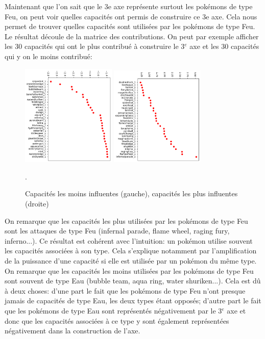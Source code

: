 \documentclass[a4paper,12pt]{article}
\begin{document}
Maintenant que l'on sait que le 3e axe représente surtout les pokémons de type Feu, on peut voir quelles capacités ont permis de construire ce 3e axe. Cela nous permet de trouver quelles capacités sont utilisées par les pokémons de type Feu. Le résultat découle de la matrice des contributions. On peut par exemple afficher les 30 capacités qui ont le plus contribué à construire le 3$^{e}$ axe et les 30 capacités qui y on le moins contribué:
\begin{figure}[!h]
    \centering
    \includegraphics[width=0.4\textwidth]{bottom_attaques_MCA.png}
    \includegraphics[width=0.4\textwidth]{top_attaques_MCA.png}
    \caption{Capacités les moins influentes (gauche), capacités les plus influentes (droite)}.
    \label{fig:image3}
\end{figure}

On remarque que les capacités les plus utilisées par les pokémons de type Feu sont les attaques de type Feu (infernal parade, flame wheel, raging fury, inferno...). Ce résultat est cohérent avec l'intuition: un pokémon utilise souvent les capacités associées à son type. Cela s'explique notamment par l'amplification de la puissance d'une capacité si elle est utilisée par un pokémon du même type. 
On remarque que les capacités les moins utilisées par les pokémons de type Feu sont souvent de type Eau (bubble team, aqua ring, water shuriken...). Cela est dû à deux choses: d'une part le fait que les pokémons de type Feu n'ont presque jamais de capacités de type Eau, les deux types étant opposés; d'autre part le fait que les pokémons de type Eau sont représentés négativement par le 3$^{e}$ axe et donc que les capacités associées à ce type y sont également représentées négativement dans la construction de l'axe.
\end{document}
